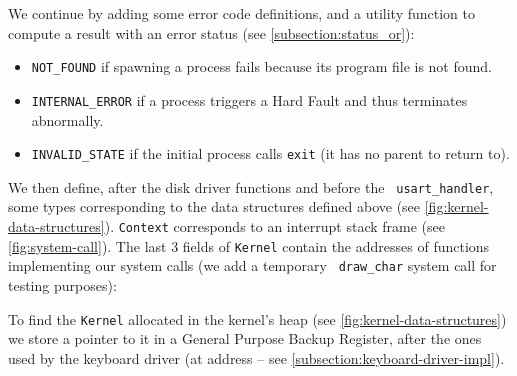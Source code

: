 
We continue by adding some error code definitions, and a utility function to
compute a result with an error status (see \cref{subsection:status_or}):
\begin{itemize}
  \item {\tt NOT\_FOUND} if spawning a process fails because its program file
  is not found.

  \item {\tt INTERNAL\_ERROR} if a process triggers a Hard Fault and thus
  terminates abnormally.

  \item {\tt INVALID\_STATE} if the initial process calls {\tt exit} (it
  has no parent to return to).
\end{itemize}



We then define, after the disk driver functions and before the {\tt
usart\_handler}, some types corresponding to the data structures defined above
(see \cref{fig:kernel-data-structures}).
{\tt Context} corresponds to an interrupt stack frame (see
\cref{fig:system-call}). The last 3 fields of {\tt Kernel} contain the
addresses of functions implementing our system calls (we add a temporary {\tt
draw\_char} system call for testing purposes):


To find the {\tt Kernel} allocated in the kernel's heap (see
\cref{fig:kernel-data-structures}) we store a pointer to it in a General
Purpose Backup Register, after the ones used by the keyboard driver (at address
 -- see \cref{subsection:keyboard-driver-impl}).

